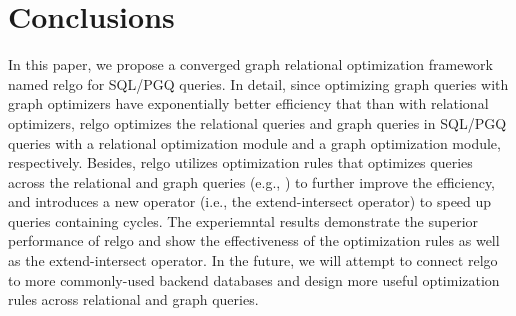 \section{Conclusions}
\label{sec:conclusions}

In this paper, we propose a converged graph relational optimization framework named relgo for SQL/PGQ queries.
In detail, since optimizing graph queries with graph optimizers have exponentially better efficiency that than with relational optimizers, relgo optimizes the relational queries and graph queries in SQL/PGQ queries with a relational optimization module and a graph optimization module, respectively.
Besides, relgo utilizes optimization rules that optimizes queries across the relational and graph queries (e.g., \filterrule) to further improve the efficiency, and introduces a new operator (i.e., the extend-intersect operator) to speed up queries containing cycles.
The experiemntal results demonstrate the superior performance of relgo and show the effectiveness of the optimization rules as well as the extend-intersect operator.
In the future, we will attempt to connect relgo to more commonly-used backend databases and design more useful optimization rules across relational and graph queries.